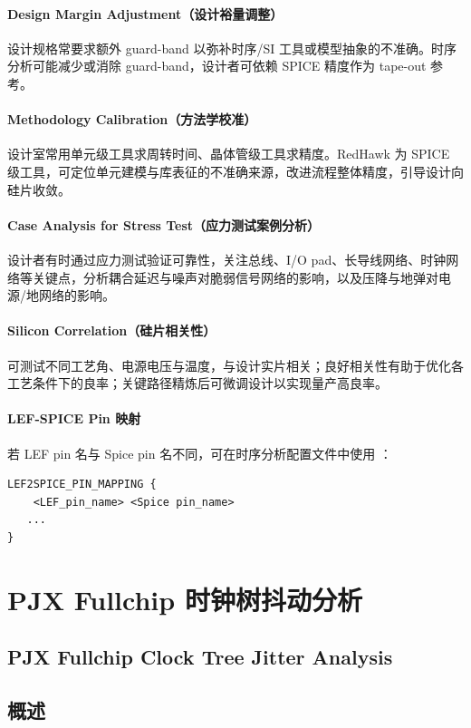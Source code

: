 \paragraph{Design Margin Adjustment（设计裕量调整）}
设计规格常要求额外 guard-band 以弥补时序/SI 工具或模型抽象的不准确。时序分析可能减少或消除 guard-band，设计者可依赖 SPICE 精度作为 tape-out 参考。

\paragraph{Methodology Calibration（方法学校准）}
设计室常用单元级工具求周转时间、晶体管级工具求精度。RedHawk 为 SPICE 级工具，可定位单元建模与库表征的不准确来源，改进流程整体精度，引导设计向硅片收敛。

\paragraph{Case Analysis for Stress Test（应力测试案例分析）}
设计者有时通过应力测试验证可靠性，关注总线、I/O pad、长导线网络、时钟网络等关键点，分析耦合延迟与噪声对脆弱信号网络的影响，以及压降与地弹对电源/地网络的影响。

\paragraph{Silicon Correlation（硅片相关性）}
可测试不同工艺角、电源电压与温度，与设计实片相关；良好相关性有助于优化各工艺条件下的良率；关键路径精炼后可微调设计以实现量产高良率。

\paragraph{LEF-SPICE Pin 映射}
若 LEF pin 名与 Spice pin 名不同，可在时序分析配置文件中使用 ：
\begin{lstlisting}
LEF2SPICE_PIN_MAPPING {
    <LEF_pin_name> <Spice pin_name>
   ...
}
\end{lstlisting}

\section{PJX Fullchip 时钟树抖动分析}
\subsection*{PJX Fullchip Clock Tree Jitter Analysis}

\subsection{概述}
